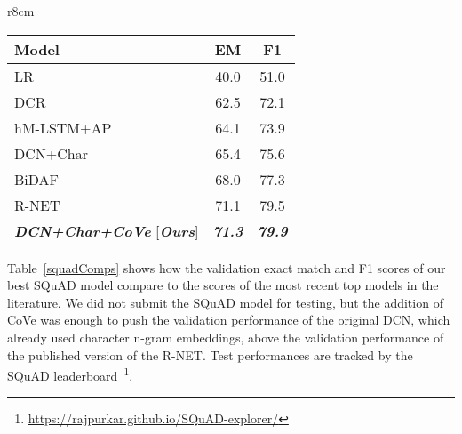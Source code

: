 \documentclass{article}
\begin{document}
\begin{wraptable}{r}{8cm}
    \vspace{-3.5mm}
  \centering
  \begin{tabular}{lcc}
    \toprule
Model & EM  & F1 \\
\midrule
LR~\citep{rajpurkar2016squad} & 40.0 & 51.0 \\
DCR~\citep{yu2017end} & 62.5 & 72.1  \\
hM-LSTM+AP~\citep{wang2017machine} & 64.1 & 73.9 \\
DCN+Char~\citep{Xiong2017} & 65.4 & 75.6 \\
BiDAF~\citep{Seo2017BidirectionalAF} & 68.0 & 77.3 \\
R-NET~\citep{Wang2017} & 71.1 & 79.5 \\
{\it \textbf{DCN+Char+CoVe} } [{\it \textbf{Ours}}] &{\it \textbf{71.3} }&{\it \textbf{79.9} }\\
\bottomrule
  \end{tabular}
      \caption{Exact match and F1 validation scores for single-model question answering.
      }
  \label{squadComps}
    \vspace{-8mm}
\end{wraptable}

Table~\ref{squadComps} shows how the validation exact match and F1 scores of our best SQuAD model compare to the scores of the most recent top models in the literature. 
We did not submit the SQuAD model for testing, 
but the addition of CoVe was enough to push the validation performance of the original DCN,
which already used character n-gram embeddings,
above the validation performance of the published version of the R-NET. 
Test performances are tracked by the SQuAD leaderboard~\footnote{\url{https://rajpurkar.github.io/SQuAD-explorer/}}.
\end{document}
